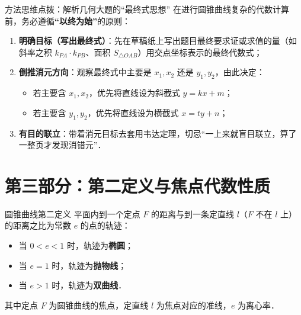 \documentclass[11pt,a4paper]{ctexart}
\begin{document}
\begin{theorembox}{方法思维点拨：解析几何大题的“最终式思想”}
在进行圆锥曲线复杂的代数计算前，务必遵循\textbf{“以终为始”}的原则：
\begin{enumerate}
  \item \textbf{明确目标（写出最终式）}：先在草稿纸上写出题目最终要求证或求值的量（如斜率之积 $k_{PA} \cdot k_{PB}$、面积 $S_{\triangle OAB}$）用交点坐标表示的最终代数式；
  \item \textbf{倒推消元方向}：观察最终式中主要是 $x_1, x_2$ 还是 $y_1, y_2$，由此决定：
        \begin{itemize}
          \item 若主要含 $x_1, x_2$，优先将直线设为斜截式 $y=kx+m$；
          \item 若主要含 $y_1, y_2$，优先将直线设为横截式 $x=ty+n$；
        \end{itemize}
  \item \textbf{有目的联立}：带着消元目标去套用韦达定理，切忌“一上来就盲目联立，算了一整页才发现消错元”．
\end{enumerate}
\end{theorembox}

\newpage

\section{第三部分：第二定义与焦点代数性质}
\begin{theorembox}{圆锥曲线第二定义}
平面内到一个定点 $F$ 的距离与到一条定直线 $l$（$F$ 不在 $l$ 上）的距离之比为常数 $e$ 的点的轨迹：
\begin{itemize}[itemsep=0.2em]
  \item 当 $0 < e < 1$ 时，轨迹为\textbf{椭圆}；
  \item 当 $e = 1$ 时，轨迹为\textbf{抛物线}；
  \item 当 $e > 1$ 时，轨迹为\textbf{双曲线}．
\end{itemize}
其中定点 $F$ 为圆锥曲线的焦点，定直线 $l$ 为焦点对应的准线，$e$ 为离心率．
\end{theorembox}

\freequestionheader
{\small \qConicDefTwoDerivationStem}
\begin{center}
  \qConicDefTwoDerivationFigure
\end{center}
\end{document}
